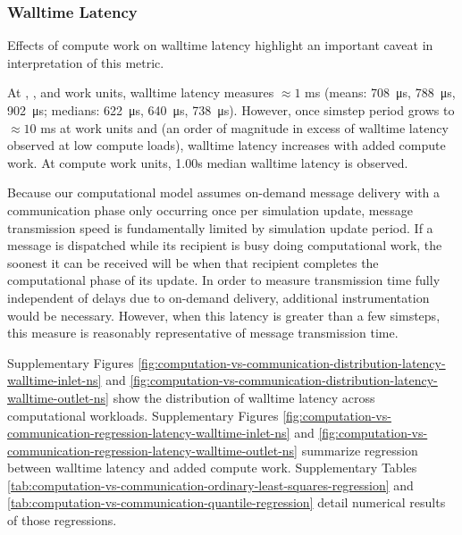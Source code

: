 
\subsubsection{Walltime Latency}

Effects of compute work on walltime latency highlight an important caveat in interpretation of this metric.

At , , and  work units, walltime latency measures $\approx 1$ ms (means: \SI{708}{\micro\second}, \SI{788}{\micro\second}, \SI{902}{\micro\second}; medians: \SI{622}{\micro\second}, \SI{640}{\micro\second}, \SI{738}{\micro\second}).
However, once simstep period grows to $\approx 10$ ms at  work units and (an order of magnitude in excess of walltime latency observed at low compute loads), walltime latency increases with added compute work.
At  compute work units, 1.00s median walltime latency is observed.

Because our computational model assumes on-demand message delivery with a communication phase only occurring once per simulation update, message transmission speed is fundamentally limited by simulation update period.
If a message is dispatched while its recipient is busy doing computational work, the soonest it can be received will be when that recipient completes the computational phase of its update.
In order to measure transmission time fully independent of delays due to on-demand delivery, additional instrumentation would be necessary.
However, when this latency is greater than a few simsteps, this measure is reasonably representative of message transmission time.

Supplementary Figures \ref{fig:computation-vs-communication-distribution-latency-walltime-inlet-ns} and \ref{fig:computation-vs-communication-distribution-latency-walltime-outlet-ns} show the distribution of walltime latency across computational workloads.
Supplementary Figures \ref{fig:computation-vs-communication-regression-latency-walltime-inlet-ns} and \ref{fig:computation-vs-communication-regression-latency-walltime-outlet-ns} summarize regression between walltime latency and added compute work.
Supplementary Tables \ref{tab:computation-vs-communication-ordinary-least-squares-regression} and \ref{tab:computation-vs-communication-quantile-regression} detail numerical results of those regressions.

